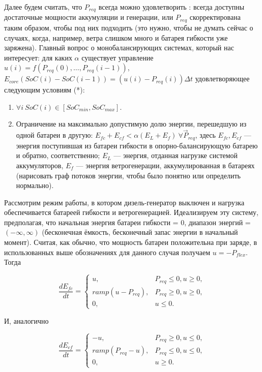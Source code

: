 Далее будем считать, что $P_{req}$ всегда можно удовлетворить : всегда доступны достаточные мощности аккумуляции и генерации, или  $P_{req}$ скорректирована таким образом, чтобы под них подходить (это нужно, чтобы не думать сейчас о случаях, когда, например, ветра слишком много и батарея гибкости уже заряжена).  
Главный вопрос о монобалансирующих системах, который нас интересует: для каких $\alpha$ существует управление $u(i) = f(P_{req}(0), \ldots, P_{req}(i-1))$, $E_{core}(SoC(i) - SoC(i-1)) = \left( u(i) - P_{req}(i)\right)\Delta t$ удовлетворяющее следующим условиям (*):
\begin{enumerate}
    \item $\forall i ~ SoC(i) \in [SoC_{min}, SoC_{max}]$.
    \item Ограничение на максимально допустимую долю энергии, перешедшую из одной батареи в другую: $E_{fc} + E_{cf} < \alpha (E_{L} + E_f) ~\forall \Vec{P}_{req}$, здесь $E_{fc}, E_{cf}$ --- энергия поступившая из батареи гибкости в опорно-балансирующую батарею и обратно, соответственно; 
    $E_{L}$ ---  энергия, отданная нагрузке системой аккумуляторов, $E_{f}$ --- энергия ветрогенерации, аккумулированная в батареях (нарисовать граф потоков энергии, чтобы было понятно или определить нормально).
\end{enumerate}

Рассмотрим режим работы, в котором дизель-генератор выключен и нагрузка обеспечивается батареей гибкости и ветрогенерацией.
Идеализируем эту систему, предполагая, что начальная энергия батареи гибкости = 0, диапазон энергий = $(-\infty, \infty)$ (бесконечная ёмкость, бесконечный запас энергии в начальный момент).
Считая, как обычно, что мощность батареи положительна при заряде, в использованных выше обозначениях для данного случая получаем $u = -P_{flex}$.
Тогда 

\begin{equation}
\label{f:Efc}
\frac{dE_{fc}}{dt} = 
\begin{cases}
u,& P_{req} \leq 0, u \geq 0,\\
ramp(u - P_{req}),& P_{req} \geq 0, u \geq 0,\\
0,& u \leq 0.
\end{cases}
\end{equation}

И, аналогично

\begin{equation}
\label{f:Ecf}
\frac{dE_{cf}}{dt} = 
\begin{cases}
-u,& P_{req} \geq 0, u \leq 0,\\
ramp(P_{req} - u),& P_{req} \leq0, u \leq 0,\\
0,& u \geq 0.
\end{cases}
\end{equation}

